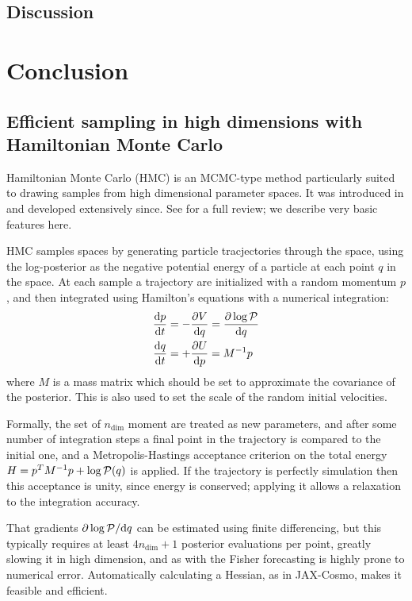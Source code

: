\documentclass[final,5p,times,twocolumn,authoryear]{elsarticle}
\begin{document}
\subsection{Discussion}


\section{Conclusion}


\subsection{Efficient sampling in high dimensions with Hamiltonian Monte Carlo}

Hamiltonian Monte Carlo (HMC) is an MCMC-type method particularly suited to drawing
samples from high dimensional parameter spaces.  It was introduced in \citep{1987PhLB..195..216D}
and developed extensively since.  See \citet{betancourt} for a full review; we describe
very basic features here.

HMC samples spaces by generating particle tracjectories through the space, using the log-posterior
as the negative potential energy of a particle at each point $q$ in the space.  At each sample a trajectory are initialized
with a random momentum $p$, and then integrated using Hamilton's equations with a numerical integration:
\begin{align}
\frac{\mathrm{d}p}{\mathrm{d}t} &= - \frac{\partial V}{\mathrm{d} q} = \frac{\partial \log{\cal P}}{\mathrm{d} q}\\
\frac{\mathrm{d}q}{\mathrm{d}t} &= + \frac{\partial U}{\mathrm{d} p} = M^{-1} p
\end{align}
where $M$ is a mass matrix which should be set to approximate the covariance of the posterior. This is also
used to set the scale of the random initial velocities.

Formally, the set of $n_\mathrm{dim}$ moment are treated as new parameters, and after 
some number of integration steps a final point in the trajectory is compared to the initial one,
and a Metropolis-Hastings acceptance criterion on the total energy $H = p^T M^{-1} p + \log{\cal P}(q)$ is applied.
If the trajectory is perfectly simulation then this acceptance is unity, since energy is conserved; applying it allows
a relaxation to the integration accuracy.

That gradients $\partial \log{\cal P} / \mathrm{d} q$ can be estimated using finite differencing,
but this typically requires at least $4 n_{\mathrm{dim}} + 1$ posterior evaluations per point, greatly slowing it
in high dimension, and as with the Fisher forecasting is highly prone to numerical error. Automatically
calculating a Hessian, as in JAX-Cosmo, makes it feasible and efficient.
\end{document}
